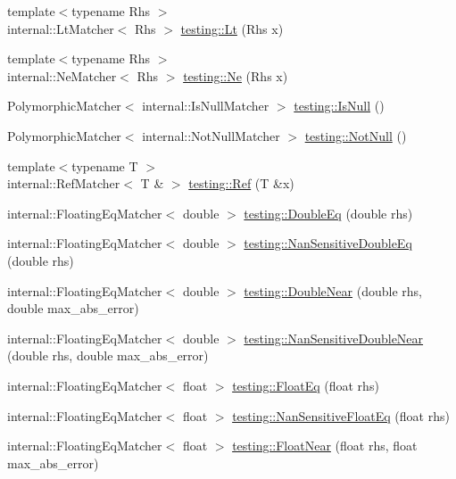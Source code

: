 \begin{DoxyCompactItemize}
\item 
{\footnotesize template$<$typename Rhs $>$ }\\internal\+::\+Lt\+Matcher$<$ Rhs $>$ \hyperlink{namespacetesting_ad621459957a8bcdd3c256b7940ecbf99}{testing\+::\+Lt} (Rhs x)
\item 
{\footnotesize template$<$typename Rhs $>$ }\\internal\+::\+Ne\+Matcher$<$ Rhs $>$ \hyperlink{namespacetesting_afe42d41d5171234cb9da5da27faeb7e8}{testing\+::\+Ne} (Rhs x)
\item 
Polymorphic\+Matcher$<$ internal\+::\+Is\+Null\+Matcher $>$ \hyperlink{namespacetesting_a56ffb1a169c14ce585fc5bed32add2db}{testing\+::\+Is\+Null} ()
\item 
Polymorphic\+Matcher$<$ internal\+::\+Not\+Null\+Matcher $>$ \hyperlink{namespacetesting_a39d1f92b53b8b2a0b6db6a22ac146416}{testing\+::\+Not\+Null} ()
\item 
{\footnotesize template$<$typename T $>$ }\\internal\+::\+Ref\+Matcher$<$ T \& $>$ \hyperlink{namespacetesting_a0a4a364121ea3fa656a112f1c2e6b7a4}{testing\+::\+Ref} (T \&x)
\item 
internal\+::\+Floating\+Eq\+Matcher$<$ double $>$ \hyperlink{namespacetesting_a1f49f9d97f03bfa4db26888f03486a9f}{testing\+::\+Double\+Eq} (double rhs)
\item 
internal\+::\+Floating\+Eq\+Matcher$<$ double $>$ \hyperlink{namespacetesting_aa83ee35256fd90033f615ef640245525}{testing\+::\+Nan\+Sensitive\+Double\+Eq} (double rhs)
\item 
internal\+::\+Floating\+Eq\+Matcher$<$ double $>$ \hyperlink{namespacetesting_aaee08ecb6815ef8398bbcb4e56d56d44}{testing\+::\+Double\+Near} (double rhs, double max\+\_\+abs\+\_\+error)
\item 
internal\+::\+Floating\+Eq\+Matcher$<$ double $>$ \hyperlink{namespacetesting_a3caa8177ef48150d0dde3a54b0961f7f}{testing\+::\+Nan\+Sensitive\+Double\+Near} (double rhs, double max\+\_\+abs\+\_\+error)
\item 
internal\+::\+Floating\+Eq\+Matcher$<$ float $>$ \hyperlink{namespacetesting_ac75507edb7998957b48fb17a9b8a020b}{testing\+::\+Float\+Eq} (float rhs)
\item 
internal\+::\+Floating\+Eq\+Matcher$<$ float $>$ \hyperlink{namespacetesting_ab3653439a654b85bdccff46d1436670d}{testing\+::\+Nan\+Sensitive\+Float\+Eq} (float rhs)
\item 
internal\+::\+Floating\+Eq\+Matcher$<$ float $>$ \hyperlink{namespacetesting_a933a78452dd1770669bed758f35ff250}{testing\+::\+Float\+Near} (float rhs, float max\+\_\+abs\+\_\+error)

\end{DoxyCompactItemize}
